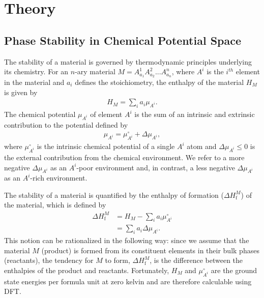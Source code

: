 \documentclass[%
 reprint,
 amsmath,amssymb,
 aps,
]{revtex4-1}
\begin{document}
\section{Theory} \label{Section_Theory}

\subsection{Phase Stability in Chemical Potential Space}
The stability of a material is governed by thermodynamic principles underlying its chemistry. For an $n$-ary material $M = A^1_{a_1} A^2_{a_2}...A^n_{a_n}$, where $A^i$ is the $i^{th}$ element in the material and $a_i$ defines the stoichiometry, the enthalpy of the material $H_M$ is given by
\begin{align} \label{Equation:ChemPotEq}
H_M = \sum_i a_i \mu_{A^i}.
\end{align}
The chemical potential $\mu_{A^i}$ of element $A^i$ is the sum of an intrinsic and extrinsic contribution to the potential defined by
\begin{align} \label{Equation:ChemPotDef}
\mu_{A^i} = \mu^{\circ}_{A^i} + \Delta \mu_{A^i},
\end{align}
where $\mu^{\circ}_{A^i}$ is the intrinsic chemical potential of a single $A^i$ atom and $\Delta \mu_{A^i} \leq 0$ is the external contribution from the chemical environment. We refer to a more negative $\Delta \mu_{A^i}$ as an $A^i$-poor environment and, in contrast, a less negative $\Delta \mu_{A^i}$ as an $A^i$-rich environment.

The stability of a material is quantified by the enthalpy of formation ($\Delta H^M_{\text{f}}$) of the material, which is defined by
\begin{equation}
\begin{aligned}
\Delta H^M_{\text{f}} & = H_M - \sum_i a_i \mu^{\circ}_{A^i} \\
& = \sum_i a_i \Delta \mu_{A^i}.
\end{aligned}
\label{Equation:EnthalpyFormation}
\end{equation}
This notion can be rationalized in the following way: since we assume that the material $M$ (product) is formed from its constituent elements in their bulk phases (reactants), the tendency for $M$ to form, $\Delta H^M_{\text{f}}$, is the difference between the enthalpies of the product and reactants. Fortunately, $H_M$ and $\mu^{\circ}_{A^i}$ are the ground state energies per formula unit at zero kelvin and are therefore calculable using DFT.
\end{document}
